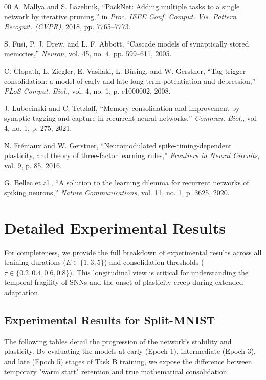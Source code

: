 \documentclass[5p,times]{elsarticle}
\begin{document}
\begin{thebibliography}{00}
 A. Mallya and S. Lazebnik, ``PackNet: Adding multiple tasks to a single network by iterative pruning,'' in \textit{Proc. IEEE Conf. Comput. Vis. Pattern Recognit. (CVPR)}, 2018, pp. 7765--7773.

 S. Fusi, P. J. Drew, and L. F. Abbott, ``Cascade models of synaptically stored memories,'' \textit{Neuron}, vol. 45, no. 4, pp. 599--611, 2005.

 C. Clopath, L. Ziegler, E. Vasilaki, L. B\"using, and W. Gerstner, ``Tag-trigger-consolidation: a model of early and late long-term-potentiation and depression,'' \textit{PLoS Comput. Biol.}, vol. 4, no. 1, p. e1000002, 2008.

 J. Luboeinski and C. Tetzlaff, ``Memory consolidation and improvement by synaptic tagging and capture in recurrent neural networks,'' \textit{Commun. Biol.}, vol. 4, no. 1, p. 275, 2021.

 N. Frémaux and W. Gerstner, ``Neuromodulated spike-timing-dependent plasticity, and theory of three-factor learning rules,'' \textit{Frontiers in Neural Circuits}, vol. 9, p. 85, 2016.

 G. Bellec et al., ``A solution to the learning dilemma for recurrent networks of spiking neurons,'' \textit{Nature Communications}, vol. 11, no. 1, p. 3625, 2020.

\end{thebibliography}

\newpage
\appendix

\section{Detailed Experimental Results}
For completeness, we provide the full breakdown of experimental results across all training durations ($E \in \{1, 3, 5\}$) and consolidation thresholds ($\tau \in \{0.2, 0.4, 0.6, 0.8\}$). This longitudinal view is critical for understanding the temporal fragility of SNNs and the onset of plasticity creep during extended adaptation.

\subsection{Experimental Results for Split-MNIST}
The following tables detail the progression of the network's stability and plasticity. By evaluating the models at early (Epoch 1), intermediate (Epoch 3), and late (Epoch 5) stages of Task B training, we expose the difference between temporary "warm start" retention and true mathematical consolidation.
\end{document}
